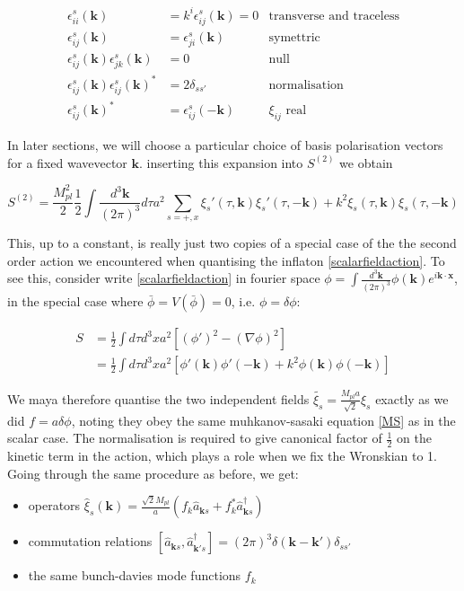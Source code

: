 \documentclass[a4paper,10pt]{article}
\renewcommand{\v}[1]{\mathbf{#1}}
\newcommand{\Mp}{M_{pl}}
\newcommand{\half}{\frac{1}{2}}
\newcommand{\bphi}{\bar{\phi}}
\newcommand{\anns}[2]{\hat{a}_{\v{#1}#2}}
\newcommand{\cres}[2]{\hat{a}^\dagger_{\v{#1}#2}}
\newcommand{\fint}[1]{\int \frac{d^3 \v{#1}}{(2\pi)^3}}
\begin{document}
\begin{align}
\epsilon_{ii}^s(\v{k}) &= k^i \epsilon_{ij}^s(\v{k}) = 0 &\text{transverse and traceless}\\
\epsilon_{ij}^s(\v{k}) &= \epsilon_{ji}^s(\v{k}) &\text{symettric}\\
\epsilon_{ij}^s(\v{k})\epsilon_{jk}^s(\v{k}) &= 0&\text{null}\\
\epsilon_{ij}^s(\v{k})\epsilon_{ij}^s(\v{k})^* &= 2\delta_{ss'} &\text{normalisation}\\
\epsilon_{ij}^s(\v{k})^* &= \epsilon_{ij}^s(\v{-k})&\text{$\xi_{ij}$ real}
\end{align}

In later sections, we will choose a particular choice of basis polarisation vectors for a fixed wavevector $\v{k}$. inserting this expansion into $S^{(2)}$ we obtain 

\begin{equation}
S^{(2)} = \frac{\Mp^2}{2} \half \fint{k} d\tau a^2 \sum_{s=+,x} \xi_s'(\tau,\v{k})\xi_s '(\tau,\v{-k})+k^2 \xi_s(\tau,\v{k})\xi_s (\tau,\v{-k})
\label{gravwaveaction}
\end{equation}

This, up to a constant, is really just two copies of a special case of the the second order action we encountered when quantising the inflaton \ref{scalarfieldaction}. To see this, consider write \ref{scalarfieldaction} in fourier space $\phi = \fint{k} \phi(\v{k})e^{i\v{k}\cdot\v{x}}$, in the special case where $\bphi = V(\bphi) = 0$, i.e. $\phi = \delta \phi$:


\begin{equation}\begin{split}
S &= \half \int d\tau d^3x a^2 [(\phi ' )^2 -(\nabla \phi)^2]\\
 &= \half \int d\tau d^3x a^2 [\phi'(\v{k})\phi'(\v{-k}) + k^2 \phi(\v{k})\phi(\v{-k})]
\end{split}\end{equation}

We maya therefore quantise the two independent fields $\tilde{\xi_s} = \frac{\Mp a}{\sqrt{2}} \xi_s$ exactly as we did $ f = a \delta \phi$, noting they obey the same muhkanov-sasaki equation \ref{MS} as in the scalar case. The normalisation is required to give canonical factor of $\half$ on the kinetic term in the action, which plays a role when we fix the Wronskian to 1. Going through the same procedure as before, we get:

\begin{itemize}
\item{operators $\hat{\xi}_s(\v{k}) = \frac{\sqrt{2}\Mp}{a}(f_k\anns{k}{s}+f_k^*\cres{k}{s})$}
\item{commutation relations $[\anns{k}{s},\cres{k'}{s}] = (2\pi)^3\delta(\v{k}-\v{k'})\delta_{ss'}$}
\item{the same bunch-davies mode functions $f_k$}
\end{itemize}
\end{document}
